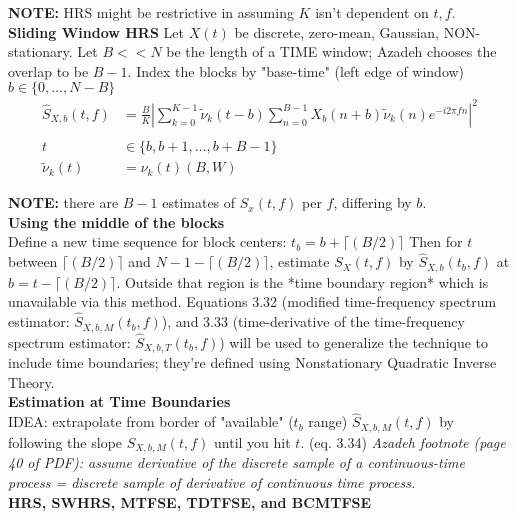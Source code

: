 \textbf{NOTE:} HRS might be restrictive in assuming $K$ isn't dependent on $t,f.$\\

\colorbox{bzadeh}{\color{black}\textbf{Sliding Window HRS}}
Let $X(t)$ be discrete, zero-mean, Gaussian, NON-stationary. Let $B<<N$ be the length of a TIME window; Azadeh chooses the overlap to be $B-1$. Index the blocks by "base-time" (left edge of window) $b\in\{0,\dots,N-B\}$
\[
\begin{aligned}
    \hat S_{X,b}(t,f) 
    &= \frac{B}{K}\left| \sum_{k=0}^{K-1}\tilde\nu_k(t-b)
                         \sum_{n=0}^{B-1} X_b(n+b)\tilde\nu_k(n)e^{-i2\pi fn} \right|^2
    \\&\\
    t &\in \{b, b+1, \dots, b+B-1\} \\
    \tilde \nu_k(t) &= \nu_k(t)(B,W)
\end{aligned}
\]

\textbf{NOTE:} there are $B-1$ estimates of $S_x(t,f)$ per $f$, differing by $b$. \\

\textbf{\large Using the middle of the blocks} \\
Define a new time sequence for block centers: $t_b = b + \lceil (B/2)\rceil$
Then for $t$ between $\lceil (B/2)\rceil$ and $N-1-\lceil (B/2)\rceil$, estimate $S_X(t,f)$ by $\hat S_{X,b}(t_b,f)$ at $b = t-\lceil (B/2)\rceil$. Outside that region is the *time boundary region* which is unavailable via this method. Equations 3.32 (modified time-frequency spectrum estimator: $\hat S_{X,b,M}(t_b,f)$), and 3.33 (time-derivative of the time-frequency spectrum estimator: $\hat S_{X,b,T}(t_b,f)$) will be used to generalize the technique to include time boundaries; they're defined using Nonstationary Quadratic Inverse Theory.\\

\textbf{\large Estimation at Time Boundaries} \\
IDEA: extrapolate from border of "available" ($t_b$ range) $\hat S_{X,b,M}(t,f)$ by following the slope $\hat S_{X,b,M}(t,f)$ until you hit $t$. (eq. 3.34) \textit{Azadeh footnote (page 40 of PDF): assume derivative of the discrete sample of a continuous-time process = discrete sample of derivative of continuous time process.}\\
\colorbox{bzadeh}{\color{black}\textbf{HRS, SWHRS, MTFSE, TDTFSE, and BCMTFSE}}

